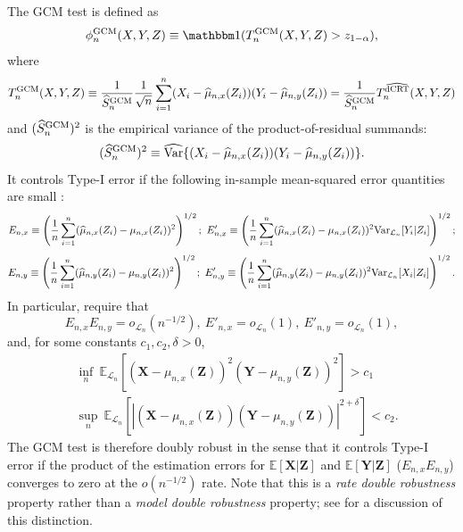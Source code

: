 \documentclass[12pt]{article}
\theoremstyle{definition}
\theoremstyle{remark}
\newcommand{\E}{\mathbb E}								%
\newcommand{\V}{\mathrm{Var}}							%
\newcommand{\indicator}{\mathbbm 1}						%
\newcommand{\prx}{\bm X}								%
\newcommand{\srx}{X}									%
\newcommand{\prz}{\bm Z}								%
\newcommand{\srz}{Z}									%
\newcommand{\pry}{{\bm Y}}								%
\newcommand{\sry}{Y}									%
\newcommand{\law}{\mathcal L}							%
\newcommand{\GCM}{\textnormal{GCM}}						%
\newcommand{\dCRThat}{\widehat{\textnormal{dCRT}}}		%
\begin{document}
	The GCM test \citep{Shah2018} is defined as
	\begin{equation}
		\phi_n^{\GCM}(\srx, \sry, \srz) \equiv \indicator(T_n^{\GCM}(\srx, \sry, \srz) > z_{1-\alpha}),
		\label{eq:gcm-test}
	\end{equation}
	where
	\begin{equation}
		T_n^{\GCM}(\srx, \sry, \srz) \equiv \frac{1}{\widehat S_{n}^{\GCM}}\frac{1}{\sqrt{n}}\sum_{i = 1}^n (\srx_i - \widehat \mu_{n,x}(\srz_i))(\sry_i - \widehat \mu_{n,y}(\srz_i)) = \frac{1}{\widehat S_{n}^{\GCM}}T_n^{\dCRThat}(\srx, \sry, \srz)
	\end{equation}
	and $(\widehat S_{n}^{\GCM})^2$ is the empirical variance of the product-of-residual summands:
	\begin{equation}
		(\widehat S_{n}^{\GCM})^2 \equiv \widehat{\V}\{(\srx_i - \widehat \mu_{n,x}(\srz_i))(\sry_i - \widehat \mu_{n,y}(\srz_i))\}.
	\end{equation}
	It controls Type-I error if the following in-sample mean-squared error quantities are small \citep{Shah2018}:
	\small
	\begin{equation*}
		E_{n, x} \equiv \left(\frac{1}{n}\sum_{i = 1}^n (\widehat \mu_{n,x}(\srz_i) -  \mu_{n,x}(\srz_i))^2\right)^{1/2};\ E'_{n, x} \equiv \left(\frac{1}{n}\sum_{i = 1}^n (\widehat \mu_{n,x}(\srz_i) -  \mu_{n,x}(\srz_i))^2\textnormal{Var}_{\law_n}[\sry_i|\srz_i]\right)^{1/2};
	\end{equation*}	
	\begin{equation*}
		E_{n, y} \equiv \left(\frac{1}{n}\sum_{i = 1}^n (\widehat \mu_{n,y}(\srz_i) -  \mu_{n,y}(\srz_i))^2\right)^{1/2};\ E'_{n, y} \equiv \left(\frac{1}{n}\sum_{i = 1}^n (\widehat \mu_{n,y}(\srz_i) -  \mu_{n,y}(\srz_i))^2\textnormal{Var}_{\law_n}[\srx_i|\srz_i]\right)^{1/2}.
	\end{equation*}
	\normalsize
	In particular, \citet{Shah2018} require that
	\begin{equation}
		E_{n, x} E_{n, y}  = o_{\law_n}(n^{-1/2}),\  E'_{n, x} = o_{\law_n}(1),\  E'_{n, y} = o_{\law_n}(1)
		\label{eq:sp1}, \tag{SP1}
	\end{equation}
	and, for some constants $c_1, c_2, \delta > 0$,
	\begin{equation}
		\begin{split}
			&\inf_n\ \E_{\law_n}[(\prx-\mu_{n,x}(\prz))^2(\pry-\mu_{n,y}(\prz))^2] > c_1\\
			&\sup_n\ \E_{\law_n}[|(\prx-\mu_{n,x}(\prz))(\pry-\mu_{n,y}(\prz))|^{2+\delta}] < c_2.
			\label{eq:sp2}
		\end{split}
		\tag{SP2}
	\end{equation}
	The GCM test is therefore doubly robust in the sense that it controls Type-I error if the product of the estimation errors for $\E[\prx|\prz]$ and $\E[\pry|\prz]$ ($E_{n,x}E_{n,y}$) converges to zero at the $o(n^{-1/2})$ rate. Note that this is a \textit{rate double robustness} property rather than a \textit{model double robustness} property; see \citet{Smucler2019} for a discussion of this distinction.
	
\end{document}

